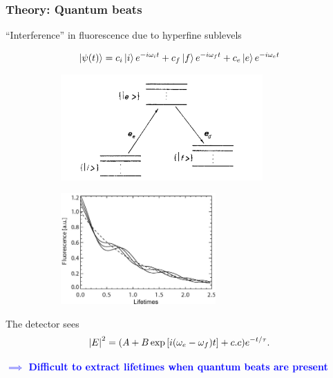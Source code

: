 \documentclass{beamer}
\theoremstyle{definition}
\begin{document}
\begin{frame}
\frametitle{Theory: Quantum beats}

``Interference'' in fluorescence due to hyperfine sublevels 


\begin{equation*}
\ket{\psi(t)} = c_i \ket{i}e^{-i\omega_i t} + c_f \ket{f}e^{-i\omega_f t} + c_e \ket{e}e^{-i\omega_e t}
\end{equation*}



\begin{figure}[!htb]
	\centering
	\hspace{10 pt}
	\begin{subfigure}{0.49\textwidth}
		\includegraphics[width=0.85\textwidth]{energies}
	\end{subfigure}
	\hspace{-20 pt}
	\begin{subfigure}{0.49\textwidth}
		\includegraphics[width=0.65\textwidth]{qbeats1}
	\end{subfigure}
\end{figure}


The detector sees
\begin{equation*}
\abs{E}^2 = (A +  B\exp\left[i(\omega_{e} - \omega_{f})t \right] + c.c)e^{-t/\tau}.
\end{equation*}

\textbf{\textcolor{blue}{$\implies$ Difficult to extract lifetimes when quantum beats are present}}

\end{frame}
\end{document}
